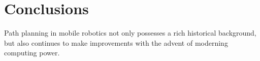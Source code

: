 \section{Conclusions}

Path planning in mobile robotics not only possesses a rich historical background, but also continues to make improvements with the advent of moderning computing power. 
